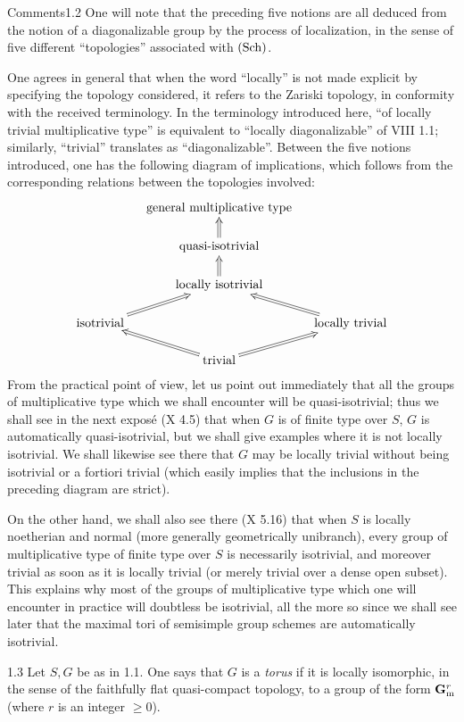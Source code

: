 \begin{enoncerm}{Comments}{1.2}\label{IX.1.2}
One will note that the preceding five notions are all deduced from the notion of a diagonalizable group by the process of localization, in the sense of five different ``topologies'' associated with $\textup{(Sch)}$.

One agrees in general that when the word ``locally'' is not made explicit by specifying the topology considered, it refers to the Zariski topology, in conformity with the received terminology. In the terminology introduced here, ``of locally trivial multiplicative type'' is equivalent to ``locally diagonalizable'' of VIII 1.1; similarly, ``trivial'' translates as ``diagonalizable''. Between the five notions introduced, one has the following diagram of implications, which follows from the corresponding relations between the topologies involved:
\[
\xymatrix@C=12pt@R=16pt{
&\text{general multiplicative type}&\\
&\text{quasi-isotrivial}\ar@{=>}[u]&\\
&\text{locally isotrivial}\ar@{=>}[u]&\\
\text{isotrivial}\ar@{=>}[ur]&&\text{locally trivial}\ar@{=>}[ul]\\
&\text{trivial}\ar@{=>}[ul]\ar@{=>}[ur]&}
\]
From the practical point of view, let us point out immediately that all the groups of multiplicative type which we shall encounter will be quasi-isotrivial; thus we shall see in the next expos\'e (X 4.5) that when $G$ is of finite type over $S$, $G$ is automatically quasi-isotrivial, but we shall give examples where it is not locally isotrivial. We shall likewise see there that $G$ may be locally trivial without being isotrivial or a fortiori trivial (which easily implies that the inclusions in the preceding diagram are strict).

On the other hand, we shall also see there (X 5.16) that when $S$ is locally noetherian and normal (more generally geometrically unibranch), every group of multiplicative type of finite type over $S$ is necessarily isotrivial, and moreover trivial as soon as it is locally trivial (or merely trivial over a dense open subset). This explains why most of the groups of multiplicative type which one will encounter in practice will doubtless be isotrivial, all the more so since we shall see later that the maximal tori of semisimple group schemes are automatically isotrivial.
\end{enoncerm}
\begin{definition}{1.3}\label{IX.1.3}
Let $S,G$ be as in 1.1. One says that $G$ is a \emph{torus} if it is locally isomorphic, in the sense of the faithfully flat quasi-compact topology, to a group of the form $\mathbf{G}_{\mathrm{m}}^r$ (where $r$ is an integer $\geq0$).
\end{definition}
